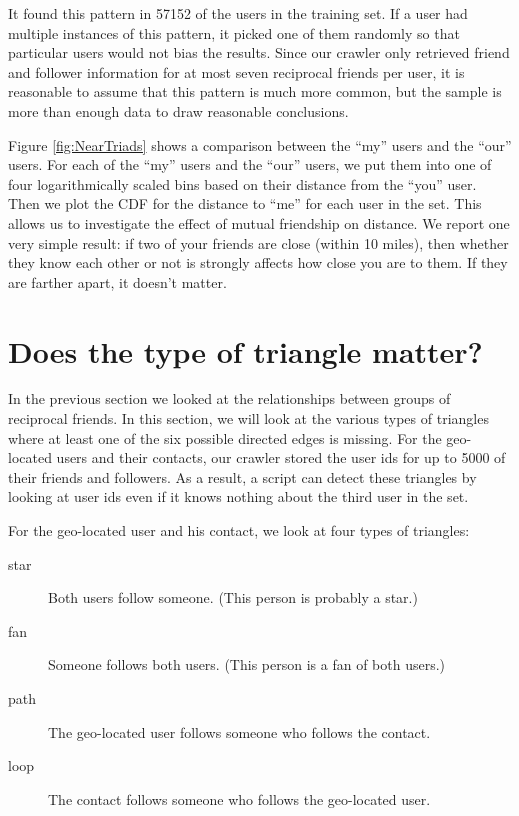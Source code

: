 It found this pattern in 57152 of the users in the training set.
If a user had multiple instances of this pattern, it picked one of them
randomly so that particular users would not bias the results.
Since our crawler only retrieved friend and follower information for at most
seven reciprocal friends per user, it is reasonable to assume that this pattern
is much more common, but the sample is more than enough data to draw reasonable
conclusions.

Figure \ref{fig:NearTriads} shows a comparison between the ``my'' users and the ``our'' users.
For each of the ``my'' users and the ``our'' users, we put them into one of four logarithmically scaled bins based on their distance from the ``you'' user. Then we plot the CDF for the distance to ``me'' for each user in the set. This allows us to investigate the effect of mutual friendship on distance.
We report one very simple result: if two of your friends are close (within 10 miles), then whether they know each other or not is strongly affects how close you are to them. If they are farther apart, it doesn't matter.

\section{Does the type of triangle matter?}


In the previous section we looked at the relationships between groups of reciprocal friends.
In this section, we will look at the various types of triangles where at least one of the six possible directed edges is missing.
For the geo-located users and their contacts, our crawler stored the user ids for up to 5000 of their friends and followers.
As a result, a script can detect these triangles by looking at user ids even if it knows nothing about the third user in the set.

For the geo-located user and his contact, we look at four types of triangles:
\begin{description}
\item[star] Both users follow someone. (This person is probably a star.)
\item[fan] Someone follows both users. (This person is a fan of both users.)
\item[path] The geo-located user follows someone who follows the contact.
\item[loop] The contact follows someone who follows the geo-located user.
\end{description}

